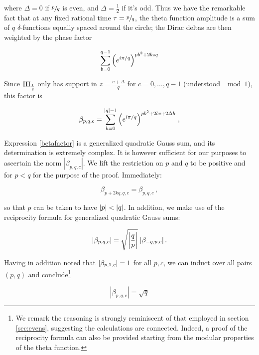 \documentclass{article}
\begin{document}
where $\Delta = 0$ if $\sfrac{p}{q}$ is even, and $\Delta = \frac{1}{2}$ if it's odd. Thus we have the remarkable fact that at any fixed rational time $\tau = \sfrac{p}{q}$, the theta function amplitude is a sum of $q$ $\delta$-functions equally spaced around the circle; the Dirac deltas are then weighted by the phase factor

\begin{equation}
    \sum_{b=0}^{q-1} \left(e^{i\pi/q}\right)^{pb^2 + 2bzq}
\end{equation}

Since $\operatorname{III}_{\frac{1}{q}}$ only has support in $z = \frac{c+\Delta}{q}$ for $c = 0,\ldots,q-1$ (understood $\mod 1$), this factor is

\begin{equation}\label{betafactor}
    \beta_{p,q,c} = \sum_{b=0}^{|q|-1} \left(e^{i\pi/q}\right)^{pb^2 + 2bc + 2\Delta b}\,,
\end{equation}

Expression \eqref{betafactor} is a generalized quadratic Gauss sum, and its determination is extremely complex. It is however sufficient for our purposes to ascertain the norm $|\beta_{p,q,c}|$. We lift the restriction on $p$ and $q$ to be positive and for $p<q$ for the purpose of the proof. Immediately:

\begin{equation}
    \beta_{p+2kq,q,c} = \beta_{p,q,c}\,,
\end{equation}

so that $p$ can be taken to have $\abs{p} < \abs{q}$. In addition, we make use of the reciprocity formula for generalized quadratic Gauss sums\cite{berndt_gauss}:

\begin{equation}
    \abs{\beta_{p,q,c}} = \sqrt{\abs{\frac{q}{p}}} \; \abs{\beta_{-q,p,c}}\,.
\end{equation}

Having in addition noted that $\abs{\beta_{p,1,c}} = 1$ for all $p,c$, we can induct over all pairs $(p,q)$ and conclude\footnote{We remark the reasoning is strongly reminiscent of that employed in section \ref{sec:evens}, suggesting the calculations are connected. Indeed, a proof of the reciprocity formula can also be provided starting from the modular properties of the theta function\cite{berndt_gauss}.}

\begin{equation}
    |\beta_{p,q,c}| = \sqrt{q}
\end{equation}
\end{document}
